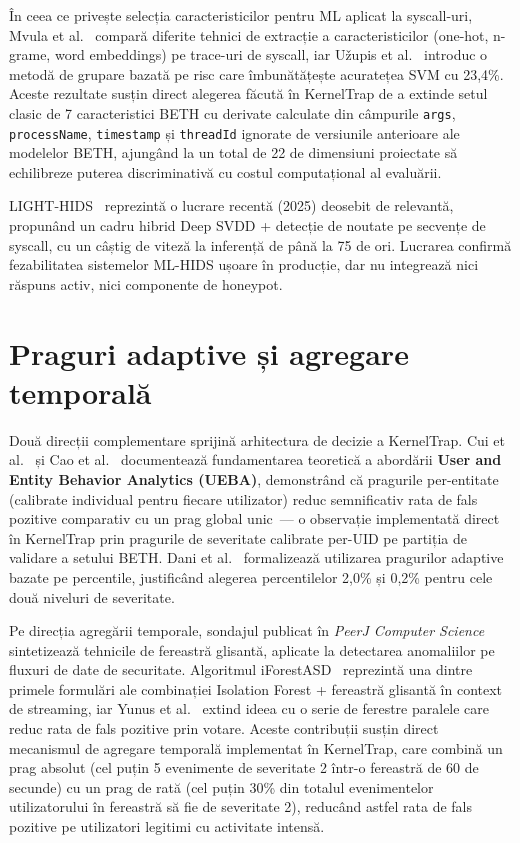În ceea ce privește selecția caracteristicilor pentru ML aplicat la
syscall-uri, Mvula et al.~\cite{mvula2023embeddings} compară diferite tehnici
de extracție a caracteristicilor (one-hot, n-grame, word embeddings) pe
trace-uri de syscall, iar Užupis et al.~\cite{uzupis2024riskbased} introduc o
metodă de grupare bazată pe risc care îmbunătățește acuratețea SVM cu 23,4\%.
Aceste rezultate susțin direct alegerea făcută în KernelTrap de a extinde setul
clasic de 7 caracteristici BETH cu derivate calculate din câmpurile
\texttt{args}, \texttt{processName}, \texttt{timestamp} și \texttt{threadId}
ignorate de versiunile anterioare ale modelelor BETH, ajungând la un total
de 22 de dimensiuni proiectate să echilibreze puterea discriminativă cu costul
computațional al evaluării.

LIGHT-HIDS~\cite{lighthids2025} reprezintă o lucrare recentă (2025) deosebit
de relevantă, propunând un cadru hibrid Deep SVDD + detecție de noutate pe
secvențe de syscall, cu un câștig de viteză la inferență de până la 75 de ori.
Lucrarea confirmă fezabilitatea sistemelor ML-HIDS ușoare în producție, dar nu
integrează nici răspuns activ, nici componente de honeypot.

\section{Praguri adaptive și agregare temporală}

Două direcții complementare sprijină arhitectura de decizie a KernelTrap.
Cui et al.~\cite{cui2022ueba} și Cao et al.~\cite{cao2023ueba} documentează
fundamentarea teoretică a abordării
\textbf{User and Entity Behavior Analytics (UEBA)}, demonstrând că pragurile
per-entitate (calibrate individual pentru fiecare utilizator) reduc semnificativ
rata de fals pozitive comparativ cu un prag global unic~--- o observație
implementată direct în KernelTrap prin pragurile de severitate calibrate
per-UID pe partiția de validare a setului BETH.
Dani et al.~\cite{dani2016adaptive} formalizează utilizarea pragurilor adaptive
bazate pe percentile, justificând alegerea percentilelor 2,0\% și 0,2\% pentru
cele două niveluri de severitate.

Pe direcția agregării temporale, sondajul publicat în
\textit{PeerJ Computer Science}~\cite{streamingsurvey2025} sintetizează
tehnicile de fereastră glisantă, aplicate la detectarea anomaliilor pe fluxuri de
date de securitate.
Algoritmul iForestASD~\cite{ding2024iforestasd} reprezintă una dintre primele
formulări ale combinației Isolation Forest + fereastră glisantă în context de
streaming, iar Yunus et al.~\cite{yunus2024sliding} extind ideea cu o serie de
ferestre paralele care reduc rata de fals pozitive prin votare.
Aceste contribuții susțin direct mecanismul de agregare temporală implementat
în KernelTrap, care combină un prag absolut (cel puțin 5 evenimente de
severitate 2 într-o fereastră de 60 de secunde) cu un prag de rată (cel puțin
30\% din totalul evenimentelor utilizatorului în fereastră să fie de severitate
2), reducând astfel rata de fals pozitive pe utilizatori legitimi cu activitate
intensă.

